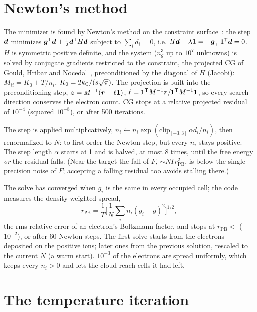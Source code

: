 \section{Newton's method}

The minimizer is found by Newton's method on the constraint surface~\cite{nocedal2006}: the step $\bm{d}$ minimizes
$\bm{g}^{\mathsf T}\bm{d} + \frac12\bm{d}^{\mathsf T}H\bm{d}$ subject to $\sum_id_i = 0$, i.e.
$H\bm{d} + \lambda\bm{1} = -\bm{g}$, $\bm{1}^{\mathsf T}\bm{d} = 0$.
$H$ is symmetric positive definite, and the system ($n_g^3$ up to $10^7$ unknowns) is solved by conjugate gradients
restricted to the constraint, the projected CG of Gould, Hribar and Nocedal~\cite{gould2001}, preconditioned by the
diagonal of $H$ (Jacobi): $M_{ii} = K_0 + T/n_i$, $K_0 = 2k_{\mathrm C}/(s\sqrt\pi)$.
The projection is built into the preconditioning step,
$\bm{z} = M^{-1}(\bm{r} - \ell\bm{1})$, $\ell = \bm{1}^{\mathsf T}M^{-1}\bm{r}/\bm{1}^{\mathsf T}M^{-1}\bm{1}$,
so every search direction conserves the electron count.
CG stops at a relative projected residual of $10^{-4}$ (squared $10^{-8}$), or after 500 iterations.

The step is applied multiplicatively, $n_i\leftarrow n_i\exp(\mathrm{clip}_{[-3,3]}\,\alpha d_i/n_i)$, then renormalized
to $N$: to first order the Newton step, but every $n_i$ stays positive.
The step length $\alpha$ starts at 1 and is halved, at most 8 times, until the free energy \emph{or} the residual
falls.
(Near the target the fall of $F$, $\sim NT r_{\mathrm{PB}}^2$, is below the single-precision noise of $F$; accepting a
falling residual too avoids stalling there.)

The solve has converged when $g_i$ is the same in every occupied cell; the code measures the density-weighted spread,
\begin{equation}
  r_{\mathrm{PB}} = \frac1T\Big[\frac1N\sum_in_i(g_i-\bar g)^2\Big]^{1/2},
\end{equation}
the rms relative error of an electron's Boltzmann factor, and stops at $r_{\mathrm{PB}} <$ 
($10^{-2}$), or after 60 Newton steps.
The first solve starts from the electrons deposited on the positive ions; later ones from the previous solution,
rescaled to the current $N$ (a warm start).
$10^{-3}$ of the electrons are spread uniformly, which keeps every $n_i>0$ and lets the cloud reach cells it had left.

\section{The temperature iteration}


